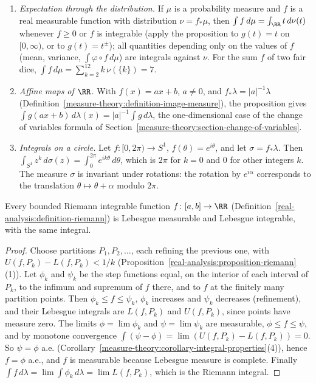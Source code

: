 \begin{example}\label{measure-theory:example-image-measure}
\begin{enumerate}
\item \emph{Expectation through the distribution.} If $\mu$ is a probability measure and $f$ is a real measurable function with distribution $\nu = f_*\mu$, then $\int f\,d\mu = \int_\RR t\,d\nu(t)$ whenever $f \geq 0$ or $f$ is integrable
(apply the proposition to $g(t) = t$ on $[0, \infty)$, or to $g(t) = t^\pm$); all quantities depending only on the values of $f$ (mean, variance, $\int\varphi \circ f\,d\mu$) are integrals against $\nu$. For the sum $f$ of two fair dice, $\int f\,d\mu = \sum_{k=2}^{12}k\,\nu(\{k\}) = 7$.
\item \emph{Affine maps of $\RR$.} With $f(x) = ax + b$, $a \neq 0$, and $f_*\lambda = |a|^{-1}\lambda$ (Definition~\ref{measure-theory:definition-image-measure}), the proposition gives
$\int g(ax + b)\,d\lambda(x) = |a|^{-1}\int g\,d\lambda$, the one-dimensional case of the change of variables formula of Section~\ref{measure-theory:section-change-of-variables}.
\item \emph{Integrals on a circle.} Let $f \colon [0, 2\pi) \to S^1$, $f(\theta) = e^{i\theta}$, and let $\sigma = f_*\lambda$. Then $\int_{S^1}z^k\,d\sigma(z) = \int_0^{2\pi}e^{ik\theta}\,d\theta$, which is $2\pi$ for $k = 0$ and $0$
for other integers $k$. The measure $\sigma$ is invariant under rotations: the rotation by $e^{i\alpha}$ corresponds to the translation $\theta \mapsto \theta + \alpha$ modulo $2\pi$.
\end{enumerate}
\end{example}

\begin{proposition}\label{measure-theory:proposition-riemann-integrable}
Every bounded Riemann integrable function $f \colon [a, b] \to \RR$ (Definition~\ref{real-analysis:definition-riemann}) is Lebesgue measurable and Lebesgue integrable, with the same integral.
\end{proposition}

\begin{proof}
Choose partitions $P_1, P_2, \ldots$, each refining the previous one, with $U(f, P_k) - L(f, P_k) < 1/k$ (Proposition~\ref{real-analysis:proposition-riemann}(1)). Let $\phi_k$ and $\psi_k$ be the step functions equal, on the interior of each interval of $P_k$,
to the infimum and supremum of $f$ there, and to $f$ at the finitely many partition points. Then $\phi_k \leq f \leq \psi_k$, $\phi_k$ increases and $\psi_k$ decreases (refinement), and their Lebesgue integrals are $L(f, P_k)$ and $U(f, P_k)$,
since points have measure zero. The limits $\phi = \lim\phi_k$ and $\psi = \lim\psi_k$ are measurable, $\phi \leq f \leq \psi$, and by monotone convergence $\int(\psi - \phi) = \lim(U(f, P_k) - L(f, P_k)) = 0$. So $\psi = \phi$ a.e.
(Corollary~\ref{measure-theory:corollary-integral-properties}(4)), hence $f = \phi$ a.e., and $f$ is measurable because Lebesgue measure is complete. Finally $\int f\,d\lambda = \lim\int\phi_k\,d\lambda = \lim L(f, P_k)$, which is the Riemann integral.
\end{proof}

